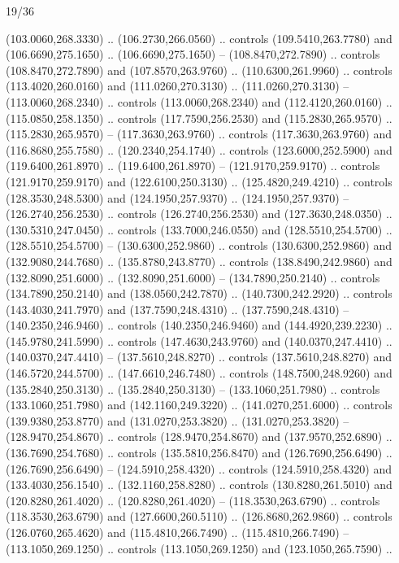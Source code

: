 \begin{flagdescription}{19/36}
\begin{scope}[yshift=\flagwidth/2,xshift=0.267\flagwidth,scale=\flagwidth/839]
\begin{scope}
{  (103.0060,268.3330) .. (106.2730,266.0560) .. controls (109.5410,263.7780) and
  (106.6690,275.1650) .. (106.6690,275.1650) -- (108.8470,272.7890) .. controls
  (108.8470,272.7890) and (107.8570,263.9760) .. (110.6300,261.9960) .. controls
  (113.4020,260.0160) and (111.0260,270.3130) .. (111.0260,270.3130) --
  (113.0060,268.2340) .. controls (113.0060,268.2340) and (112.4120,260.0160) ..
  (115.0850,258.1350) .. controls (117.7590,256.2530) and (115.2830,265.9570) ..
  (115.2830,265.9570) -- (117.3630,263.9760) .. controls (117.3630,263.9760) and
  (116.8680,255.7580) .. (120.2340,254.1740) .. controls (123.6000,252.5900) and
  (119.6400,261.8970) .. (119.6400,261.8970) -- (121.9170,259.9170) .. controls
  (121.9170,259.9170) and (122.6100,250.3130) .. (125.4820,249.4210) .. controls
  (128.3530,248.5300) and (124.1950,257.9370) .. (124.1950,257.9370) --
  (126.2740,256.2530) .. controls (126.2740,256.2530) and (127.3630,248.0350) ..
  (130.5310,247.0450) .. controls (133.7000,246.0550) and (128.5510,254.5700) ..
  (128.5510,254.5700) -- (130.6300,252.9860) .. controls (130.6300,252.9860) and
  (132.9080,244.7680) .. (135.8780,243.8770) .. controls (138.8490,242.9860) and
  (132.8090,251.6000) .. (132.8090,251.6000) -- (134.7890,250.2140) .. controls
  (134.7890,250.2140) and (138.0560,242.7870) .. (140.7300,242.2920) .. controls
  (143.4030,241.7970) and (137.7590,248.4310) .. (137.7590,248.4310) --
  (140.2350,246.9460) .. controls (140.2350,246.9460) and (144.4920,239.2230) ..
  (145.9780,241.5990) .. controls (147.4630,243.9760) and (140.0370,247.4410) ..
  (140.0370,247.4410) -- (137.5610,248.8270) .. controls (137.5610,248.8270) and
  (146.5720,244.5700) .. (147.6610,246.7480) .. controls (148.7500,248.9260) and
  (135.2840,250.3130) .. (135.2840,250.3130) -- (133.1060,251.7980) .. controls
  (133.1060,251.7980) and (142.1160,249.3220) .. (141.0270,251.6000) .. controls
  (139.9380,253.8770) and (131.0270,253.3820) .. (131.0270,253.3820) --
  (128.9470,254.8670) .. controls (128.9470,254.8670) and (137.9570,252.6890) ..
  (136.7690,254.7680) .. controls (135.5810,256.8470) and (126.7690,256.6490) ..
  (126.7690,256.6490) -- (124.5910,258.4320) .. controls (124.5910,258.4320) and
  (133.4030,256.1540) .. (132.1160,258.8280) .. controls (130.8280,261.5010) and
  (120.8280,261.4020) .. (120.8280,261.4020) -- (118.3530,263.6790) .. controls
  (118.3530,263.6790) and (127.6600,260.5110) .. (126.8680,262.9860) .. controls
  (126.0760,265.4620) and (115.4810,266.7490) .. (115.4810,266.7490) --
  (113.1050,269.1250) .. controls (113.1050,269.1250) and (123.1050,265.7590) ..
}
\end{scope}
\end{scope}
\end{flagdescription}
